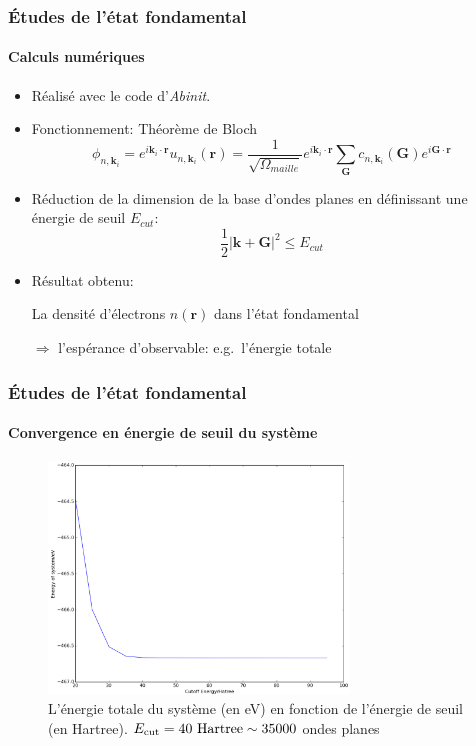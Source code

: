 \documentclass[french]{beamer}
\newcommand{\vb}[1]{\mathbf{#1}}
\newcommand{\V}[1]{\textnormal{#1}}
\begin{document}
\newpage
\begin{frame}
\frametitle{Études de l'état fondamental}
\framesubtitle{Calculs numériques}
\begin{itemize}
  \item Réalisé avec le code d'\textit{Abinit}.
  \item Fonctionnement:
    Théorème de Bloch
    \begin{equation*}
      \phi_{n,\textbf{k}_i}
      = e^{i\textbf{k}_i\cdot\textbf{r}} u_{n,\textbf{k}_i}(\textbf{r})
      = \frac{1}{\sqrt{\Omega_{maille}}}e^{i\textbf{k}_i\cdot\textbf{r}}\sum_{\textbf{G}} c_{n,\textbf{k}_i}(\textbf{G})e^{i\textbf{G}\cdot\textbf{r}}
    \end{equation*}
  \item Réduction de la dimension de la base d'ondes planes en définissant une énergie de seuil $E_{cut}$:
    \begin{equation*}
      \frac{1}{2}|\textbf{k}+\textbf{G}|^2 \leq E_{cut}
    \end{equation*}

  \item Résultat obtenu:

    La densité d'électrons $n(\vb{r})$ dans l'état fondamental

    $\Rightarrow$ l'espérance d'observable: e.g.\ l'énergie totale

\end{itemize}

\end{frame}

\begin{frame}
\frametitle{Études de l'état fondamental}
\framesubtitle{Convergence en énergie de seuil du système}
\begin{figure}[!h]
    \centering
    \includegraphics[width=8cm]{E_cut}
    \caption{L'énergie totale du système (en eV) en fonction de l'énergie de seuil (en Hartree). $E_{\V{cut}} = 40\ \V{Hartree}\sim 35000$ ondes planes }\label{fig-Ecut}
\end{figure}
\end{frame}
\end{document}
